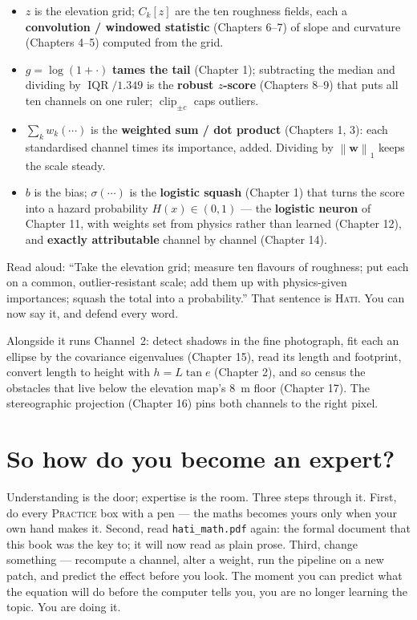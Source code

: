 \documentclass[11pt,oneside]{book}
\newcommand{\norm}[1]{\left\lVert #1\right\rVert}
\begin{document}
\begin{itemize}[leftmargin=1.5em]
\item $z$ is the elevation grid; $C_k[z]$ are the ten roughness fields, each a
\textbf{convolution / windowed statistic} (Chapters 6--7) of slope and curvature
(Chapters 4--5) computed from the grid.
\item $g=\log(1+\cdot)$ \textbf{tames the tail} (Chapter 1); subtracting the median and
dividing by $\operatorname{IQR}/1.349$ is the \textbf{robust $z$-score} (Chapters 8--9)
that puts all ten channels on one ruler; $\operatorname{clip}_{\pm c}$ caps outliers.
\item $\sum_k w_k(\cdots)$ is the \textbf{weighted sum / dot product} (Chapters 1, 3):
each standardised channel times its importance, added. Dividing by
$\norm{\mathbf w}_1$ keeps the scale steady.
\item $b$ is the bias; $\sigma(\cdots)$ is the \textbf{logistic squash} (Chapter 1)
that turns the score into a hazard probability $H(x)\in(0,1)$ --- the \textbf{logistic
neuron} of Chapter 11, with weights set from physics rather than learned (Chapter 12),
and \textbf{exactly attributable} channel by channel (Chapter 14).
\end{itemize}

\begin{keyidea}
Read aloud: ``Take the elevation grid; measure ten flavours of roughness; put each on a
common, outlier-resistant scale; add them up with physics-given importances; squash the
total into a probability.'' That sentence is \textsc{Hati}. You can now say it, and
defend every word.
\end{keyidea}

Alongside it runs Channel~2: detect shadows in the fine photograph, fit each an ellipse
by the covariance eigenvalues (Chapter 15), read its length and footprint, convert
length to height with $h=L\tan e$ (Chapter 2), and so census the obstacles that live
below the elevation map's \SI{8}{m} floor (Chapter 17). The stereographic projection
(Chapter 16) pins both channels to the right pixel.

\section*{So how do you become an expert?}
Understanding is the door; expertise is the room. Three steps through it.
First, do every \textsc{Practice} box with a pen --- the maths becomes yours only when
your own hand makes it. Second, read \texttt{hati\_math.pdf} again: the formal document
that this book was the key to; it will now read as plain prose. Third, change something
--- recompute a channel, alter a weight, run the pipeline on a new patch, and predict
the effect before you look. The moment you can predict what the equation will do before
the computer tells you, you are no longer learning the topic. You are doing it.
\end{document}
